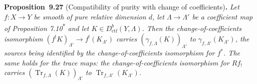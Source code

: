 \documentclass[11pt]{article}
\newenvironment{bpstatement}[2]{\par\addvspace{0.6\baselineskip}\noindent\textbf{#1}#2\textbf{.}\enspace\ignorespaces}
  {\par\addvspace{0.4\baselineskip}}
\newenvironment{bpstatementit}[2]{\begin{bpstatement}{#1}{#2}\itshape\ignorespaces}{\end{bpstatement}}
\newcommand{\bpout}[1]{#1\textsuperscript{\hyperlink{bp-outside}{\ensuremath{\ast}}}}
\begin{document}
\label{bp92}%
\begin{bpstatementit}{Proposition~9.27}{ (Compatibility of purity with change of coefficients)}
Let \(f:X\to Y\) be smooth of pure relative dimension \(d\), let \(\Lambda\to\Lambda'\) be a coefficient map of Proposition \bpout{7.10} and let \(K\in D^b_{\mathrm{ctf}}(Y,\Lambda)\). Then the change-of-coefficients isomorphism \((f^!K)_{\Lambda'}\to f^!(K_{\Lambda'})\) carries \((\gamma_{f,\Lambda}(K))_{\Lambda'}\) to \(\gamma_{f,\Lambda'}(K_{\Lambda'})\), the sources being identified by the change-of-coefficients isomorphism for \(f^*\). The same holds for the trace maps: the change-of-coefficients isomorphism for \(Rf_!\) carries \((\operatorname{Tr}_{f,\Lambda}(K))_{\Lambda'}\) to \(\operatorname{Tr}_{f,\Lambda'}(K_{\Lambda'})\).
\end{bpstatementit}
\end{document}
